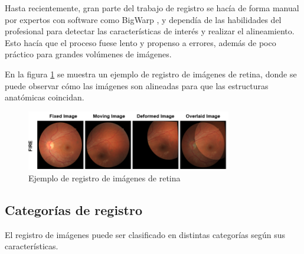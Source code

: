 Hasta recientemente, gran parte del trabajo de registro se hacía de forma manual por expertos con software como BigWarp \cite{bigwarp},
y dependía de las habilidades del profesional para detectar las características de interés y realizar el alineamiento.
Esto hacía que el proceso fuese lento y propenso a errores, además de poco práctico para grandes volúmenes de imágenes.

En la figura \ref{fig:retin_reg} se muestra un ejemplo de registro de imágenes de retina, donde se puede observar cómo las imágenes son alineadas para que las estructuras anatómicas coincidan.

\begin{figure}[tbp]
    \centering
    \includegraphics[width=0.8\textwidth]{imaxes/retin-reg.png}
    \caption{Ejemplo de registro de imágenes de retina \cite{sivaraman2024retinaregnetzeroshotapproachretinal}}
    \label{fig:retin_reg}
\end{figure}

\subsection{Categorías de registro}\label{subsec:Categorías de registro}

El registro de imágenes puede ser clasificado en distintas categorías según sus características.

